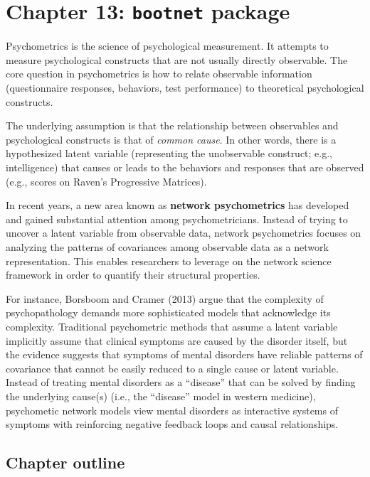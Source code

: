 \documentclass[
]{book}
\begin{document}
\chapter{\texorpdfstring{Chapter 13: \texttt{bootnet} package}{Chapter 13: bootnet package}}\label{ch13}

Psychometrics is the science of psychological measurement. It attempts to measure psychological constructs that are not usually directly observable. The core question in psychometrics is how to relate observable information (questionnaire responses, behaviors, test performance) to theoretical psychological constructs.

The underlying assumption is that the relationship between observables and psychological constructs is that of \emph{common cause}. In other words, there is a hypothesized latent variable (representing the unobservable construct; e.g., intelligence) that causes or leads to the behaviors and responses that are observed (e.g., scores on Raven's Progressive Matrices).

In recent years, a new area known as \textbf{network psychometrics} has developed and gained substantial attention among psychometricians. Instead of trying to uncover a latent variable from observable data, network psychometrics focuses on analyzing the patterns of covariances among observable data as a network representation. This enables researchers to leverage on the network science framework in order to quantify their structural properties.

For instance, Borsboom and Cramer (2013) argue that the complexity of psychopathology demands more sophisticated models that acknowledge its complexity. Traditional psychometric methods that assume a latent variable implicitly assume that clinical symptoms are caused by the disorder itself, but the evidence suggests that symptoms of mental disorders have reliable patterns of covariance that cannot be easily reduced to a single cause or latent variable. Instead of treating mental disorders as a ``disease'' that can be solved by finding the underlying cause(s) (i.e., the ``disease'' model in western medicine), psychometic network models view mental disorders as interactive systems of symptoms with reinforcing negative feedback loops and causal relationships.

\section{Chapter outline}\label{chapter-outline}
\end{document}
